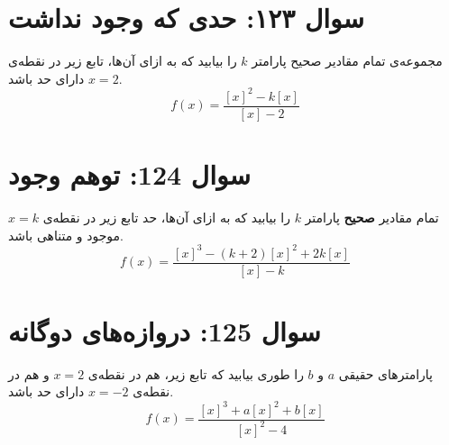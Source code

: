 \documentclass[12pt]{article}
\begin{document}
\vspace{1cm}
\hrulefill
\vspace{1cm}

\section*{سوال ۱۲۳: حدی که وجود نداشت}
مجموعه‌ی تمام مقادیر صحیح پارامتر \(k\) را بیابید که به ازای آن‌ها، تابع زیر در نقطه‌ی \(x=2\) دارای حد باشد.
\begin{displaymath}
	f(x) = \frac{[x]^2 - k[x]}{[x] - 2}
\end{displaymath}



\vspace{1cm}
\hrulefill
\vspace{1cm}

\section*{سوال 124: توهم وجود}
تمام مقادیر \textbf{صحیح} پارامتر \(k\) را بیابید که به ازای آن‌ها، حد تابع زیر در نقطه‌ی \(x=k\) موجود و متناهی باشد.
\begin{displaymath}
	f(x) = \frac{ [x]^3 - (k+2)[x]^2 + 2k[x] }{ [x] - k }
\end{displaymath}

\vspace{1cm}
\hrulefill
\vspace{1cm}

\section*{سوال 125: دروازه‌های دوگانه}
پارامترهای حقیقی \(a\) و \(b\) را طوری بیابید که تابع زیر، هم در نقطه‌ی \(x=2\) و هم در نقطه‌ی \(x=-2\) دارای حد باشد.
\begin{displaymath}
	f(x) = \frac{[x]^3 + a[x]^2 + b[x]}{[x]^2 - 4}
\end{displaymath}
\end{document}
